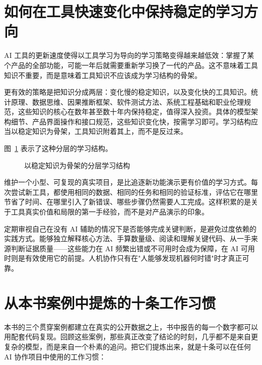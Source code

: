 \section{如何在工具快速变化中保持稳定的学习方向}

AI 工具的更新速度使得以工具学习为导向的学习策略变得越来越低效：掌握了某个产品的全部功能，可能一年后就需要重新学习换了一代的产品。这不意味着工具知识不重要，而是意味着工具知识不应该成为学习结构的骨架。

更有效的策略是把知识分成两层：变化慢的稳定知识，以及变化快的工具知识。统计原理、数据思维、因果推断框架、软件测试方法、系统工程基础和职业伦理规范，这些知识的核心在数年甚至数十年内保持稳定，值得深入投资。具体的模型架构细节、产品界面操作和接口规范，这些知识变化快，按需学习即可。学习结构应当以稳定知识为骨架，工具知识附着其上，而不是反过来。

图~\ref{fig:ch18_layers} 表示了这种分层的学习结构。

\begin{figure}[H]
  \centering
  \caption{以稳定知识为骨架的分层学习结构}
  \label{fig:ch18_layers}
\end{figure}

维护一个小型、可复现的真实项目，是比追逐新功能演示更有价值的学习方式。每次尝试新工具，都使用相同的数据、相同的任务和相同的验证标准，评估它在哪里节省了时间、在哪里引入了新错误、哪些步骤仍然需要人工完成。这样积累的是关于工具真实价值和局限的第一手经验，而不是对产品演示的印象。

定期审视自己在没有 AI 辅助的情况下是否能够完成关键判断，是避免过度依赖的实践方式。能够独立解释核心方法、手算数量级、阅读和理解关键代码、从一手来源判断证据质量——这些能力在 AI 频繁出错或不可用时会成为保障，在 AI 可用时则是有效使用它的前提。人机协作只有在"人能够发现机器何时错"时才真正可靠。

\section{从本书案例中提炼的十条工作习惯}

本书的三个贯穿案例都建立在真实的公开数据之上，书中报告的每一个数字都可以用配套代码复现。回顾这些案例，那些真正改变了结论的时刻，几乎都不是来自更复杂的模型，而是来自一个朴素的追问。把它们提炼出来，就是十条可以在任何 AI 协作项目中使用的工作习惯：

